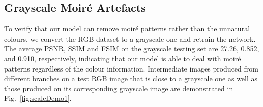 \documentclass[journal]{IEEEtran}
\begin{document}
\begin{table*}[t]
\centering
\caption{A quantitative comparison among participating methods on our test set with different metrics. Our method clearly outperforms the other methods.}
\label{table:PSNRcompare}
\end{table*}


\subsection{Grayscale Moir\'{e} Artefacts}
To verify that our model can remove moir\'{e} patterns rather than the unnatural colours, we convert the RGB dataset to a grayscale one and retrain the network. The average PSNR, SSIM and FSIM on the grayscale testing set are 27.26, 0.852, and 0.910, respectively, indicating that our model is able to deal with moir\'{e} patterns regardless of the colour information. Intermediate images produced from different branches on a test RGB image that is close to a grayscale one as well as those produced on its corresponding grayscale image are demonstrated in Fig.~\ref{fig:scaleDemo1}. 
\end{document}
